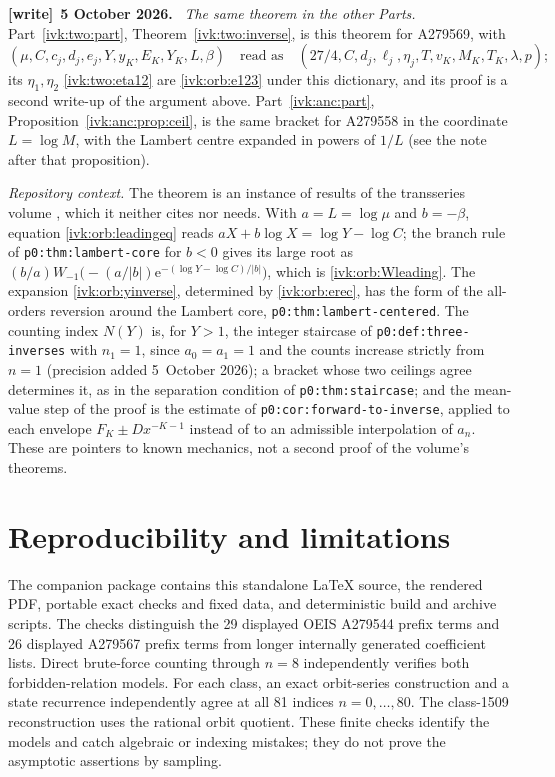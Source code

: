 \documentclass[11pt,letterpaper]{article}
\theoremstyle{remark}\newtheorem{remark}[theorem]{Remark}
\newenvironment{writenote}[1][]{\par\smallskip\begingroup\small
 \noindent\textbf{[write]}\if\relax\detokenize{#1}\relax\else~\textbf{#1.}\fi\ }%
 {\par\endgroup\smallskip}
\begin{document}
\begin{writenote}[5 October 2026]
\emph{The same theorem in the other Parts.} Part~\ref{ivk:two:part}, Theorem~\ref{ivk:two:inverse}, is this theorem for A279569, with
\[(\mu,C,c_j,d_j,e_j,Y,y_K,E_K,Y_K,L,\beta)\quad\text{read as}\quad(27/4,C,d_j,\ell_j,\eta_j,T,v_K,M_K,T_K,\lambda,p);\] its $\eta_1,\eta_2$ \eqref{ivk:two:eta12} are \eqref{ivk:orb:e123} under this dictionary, and its proof is a second write-up of the argument above. Part~\ref{ivk:anc:part}, Proposition~\ref{ivk:anc:prop:ceil}, is the same bracket for A279558 in the coordinate $L=\log M$, with the Lambert centre expanded in powers of $1/L$ (see the note after that proposition).

\emph{Repository context.} The theorem is an instance of results of the transseries volume \cite{tsvol}, which it neither cites nor needs. With $a=L=\log\mu$ and $b=-\beta$, equation \eqref{ivk:orb:leadingeq} reads $aX+b\log X=\log Y-\log C$; the branch rule of \texttt{p0:thm:lambert-core} for $b<0$ gives its large root as $(b/a)W_{-1}\bigl(-(a/|b|)\mathrm e^{-(\log Y-\log C)/|b|}\bigr)$, which is \eqref{ivk:orb:Wleading}. The expansion \eqref{ivk:orb:yinverse}, determined by \eqref{ivk:orb:erec}, has the form of the all-orders reversion around the Lambert core, \texttt{p0:thm:lambert-centered}. The counting index $N(Y)$ is, for $Y>1$, the integer staircase of \texttt{p0:def:three-inverses} with $n_1=1$, since $a_0=a_1=1$ and the counts increase strictly from $n=1$ (precision added 5~October 2026); a bracket whose two ceilings agree determines it, as in the separation condition of \texttt{p0:thm:staircase}; and the mean-value step of the proof is the estimate of \texttt{p0:cor:forward-to-inverse}, applied to each envelope $F_K\pm Dx^{-K-1}$ instead of to an admissible interpolation of $a_n$. These are pointers to known mechanics, not a second proof of the volume's theorems.
\end{writenote}


\section{Reproducibility and limitations}\label{ivk:orb:sec:reproduce}
The companion package contains this standalone \LaTeX{} source, the
rendered PDF, portable exact checks and fixed data, and deterministic
build and archive scripts. The checks distinguish the 29 displayed
OEIS A279544 prefix terms and 26 displayed A279567 prefix terms from
longer internally generated coefficient lists. Direct brute-force
counting through $n=8$ independently verifies both forbidden-relation
models. For each class, an exact orbit-series construction and a state
recurrence independently agree at all 81 indices $n=0,\ldots,80$.
The class-1509 reconstruction uses the rational orbit quotient. These finite checks identify the models and catch algebraic
or indexing mistakes; they do not prove the asymptotic assertions by
sampling.
\end{document}

